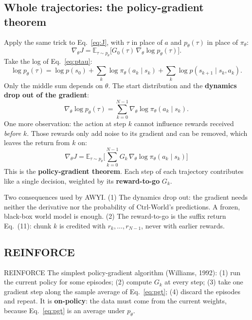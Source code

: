 \documentclass[11pt,a4paper]{article}
\newcommand{\E}{\mathbb{E}}
\begin{document}
\subsection{Whole trajectories: the policy-gradient theorem}
Apply the same trick to Eq.~\eqref{eq:J}, with $\tau$ in place of $a$ and $p_\theta(\tau)$ in place of $\pi_\theta$:
\[\nabla_\theta J=\E_{\tau\sim p_\theta}\big[G_0(\tau)\,\nabla_\theta\log p_\theta(\tau)\big].\]
Take the log of Eq.~\eqref{eq:ptau}:
\[
\log p_\theta(\tau)=\log p(s_0)+\sum_k\log\pi_\theta(a_k\mid s_k)+\sum_k\log p(s_{k+1}\mid s_k,a_k).
\]
Only the middle sum depends on $\theta$. The start distribution and the \textbf{dynamics drop out of the gradient}:
\begin{equation}
\nabla_\theta\log p_\theta(\tau)=\sum_{k=0}^{N-1}\nabla_\theta\log\pi_\theta(a_k\mid s_k).
\end{equation}
One more observation: the action at step $k$ cannot influence rewards received \emph{before} $k$. Those rewards only add noise to its gradient and can be removed, which leaves the return from $k$ on:
\begin{equation}
\boxed{\ \nabla_\theta J=\E_{\tau\sim p_\theta}\Big[\sum_{k=0}^{N-1}G_k\,\nabla_\theta\log\pi_\theta(a_k\mid s_k)\Big]\ }
\label{eq:pgt}
\end{equation}
This is the \textbf{policy-gradient theorem}. Each step of each trajectory contributes like a single decision, weighted by its \textbf{reward-to-go} $G_k$.

\begin{paperlink}
Two consequences used by AWYI. (1) The dynamics drop out: the gradient needs neither the derivative nor the probability of Ctrl-World's predictions. A frozen, black-box world model is enough. (2) The reward-to-go is the suffix return Eq.~(11): chunk $k$ is credited with $r_k,\dots,r_{N-1}$, never with earlier rewards.
\end{paperlink}

\subsection{REINFORCE}
\begin{newc}{REINFORCE}
The simplest policy-gradient algorithm (Williams, 1992): (1) run the current policy for some episodes; (2) compute $G_k$ at every step; (3) take one gradient step along the sample average of Eq.~\eqref{eq:pgt}; (4) discard the episodes and repeat. It is \textbf{on-policy}: the data must come from the current weights, because Eq.~\eqref{eq:pgt} is an average under $p_\theta$.
\end{newc}
\end{document}
